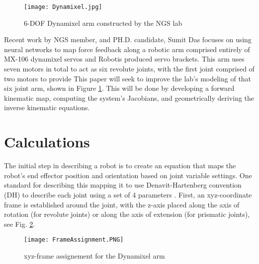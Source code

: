 \documentclass[10pt,journal]{IEEEtran}
\begin{document}
\begin{figure}[ht!]
\centering
\texttt{[image: Dynamixel.jpg]}
\caption{6-DOF Dynamixel arm constructed by the NGS lab} 
\label{fig:DynamixelPhoto}
\end{figure}

\par Recent work by NGS member, and PH.D. candidate, Sumit Das focuses on using neural networks to map force feedback along a robotic arm comprised entirely of MX-106 dynamixel servos and Robotis produced servo brackets. This arm uses seven motors in total to act as six revolute joints, with the first joint comprised of two motors to provide  This paper will seek to improve the lab's modeling of that six joint arm, shown in Figure \ref{fig:DynamixelPhoto}. This will be done by developing a forward kinematic map, computing the system's Jacobians, and geometrically deriving the inverse kinematic equations. 

\section{Calculations} %
The initial step in describing a robot is to create an equation that maps the robot's end effector position and orientation based on joint variable settings. One standard for describing this mapping it to use Denavit-Hartenberg convention (DH) to describe each joint using a set of 4 parameters \cite{siciliano2009robotics}. First, an xyz-coordinate frame is established around the joint, with the z-axis placed along the axis of rotation (for revolute joints) or along the axis of extension (for prismatic joints), see Fig. \ref{fig:frameAssignment}. 

\begin{figure}[ht!]
\texttt{[image: FrameAssignment.PNG]}
\caption{xyz-frame assignement for the Dynamixel arm}
\label{fig:frameAssignment}
\end{figure}
\end{document}
